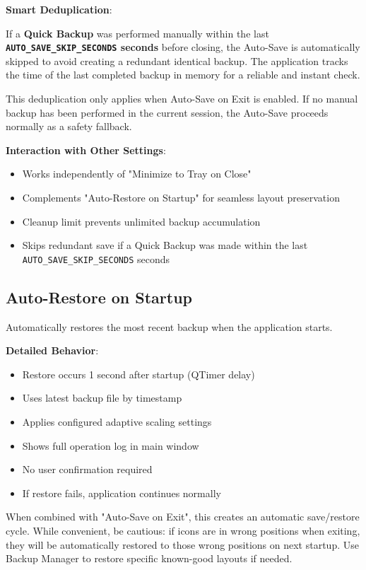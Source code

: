 \documentclass[a4paper,11pt]{article}
\begin{document}
\textbf{Smart Deduplication}:

If a \textbf{Quick Backup} was performed manually within the last
\textbf{\texttt{AUTO\_SAVE\_SKIP\_SECONDS} seconds} before closing,
the Auto-Save is automatically
skipped to avoid creating a redundant identical backup. The application
tracks the time of the last completed backup in memory for a reliable
and instant check.

\begin{infobox}[Note]
  This deduplication only applies when Auto-Save on Exit is enabled.
  If no manual backup has been performed in the current session, the
  Auto-Save proceeds normally as a safety fallback.
\end{infobox}

\textbf{Interaction with Other Settings}:
\begin{itemize}
  \item Works independently of "Minimize to Tray on Close"
  \item Complements "Auto-Restore on Startup" for seamless layout preservation
  \item Cleanup limit prevents unlimited backup accumulation
  \item Skips redundant save if a Quick Backup was made within the
    last \texttt{AUTO\_SAVE\_SKIP\_SECONDS} seconds
\end{itemize}

\subsection{Auto-Restore on Startup}

Automatically restores the most recent backup when the application starts.

\textbf{Detailed Behavior}:
\begin{itemize}
  \item Restore occurs 1 second after startup (QTimer delay)
  \item Uses latest backup file by timestamp
  \item Applies configured adaptive scaling settings
  \item Shows full operation log in main window
  \item No user confirmation required
  \item If restore fails, application continues normally
\end{itemize}

\begin{warningbox}
  When combined with "Auto-Save on Exit", this creates an automatic
  save/restore cycle. While convenient, be cautious: if icons are in
  wrong positions when exiting, they will be automatically restored
  to those wrong positions on next startup. Use Backup Manager to
  restore specific known-good layouts if needed.
\end{warningbox}
\end{document}
